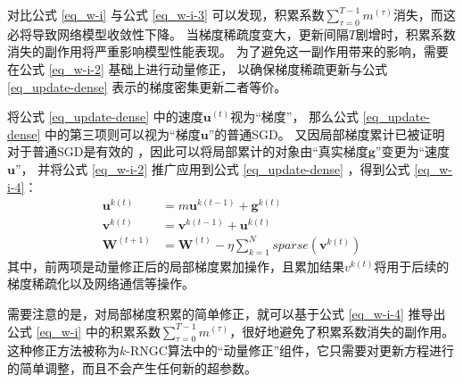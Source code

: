 \documentclass{xdupgthesis}
\begin{document}
对比公式 \eqref{eq_w-i} 与公式 \eqref{eq_w-i-3} 可以发现，积累系数$\sum_{\tau=0}^{T-1}m^{(\tau)}$消失，而这必将导致网络模型收敛性下降。
当梯度稀疏度变大，更新间隔$T$剧增时，积累系数消失的副作用将严重影响模型性能表现。
为了避免这一副作用带来的影响，需要在公式 \eqref{eq_w-i-2} 基础上进行动量修正，
以确保梯度稀疏更新与公式 \eqref{eq_update-dense} 表示的梯度密集更新二者等价。

将公式 \eqref{eq_update-dense} 中的速度$\mathbf{u}^{(t)}$视为“梯度”，
那么公式 \eqref{eq_update-dense} 中的第三项则可以视为“梯度$\mathbf{u}$”的普通SGD。
又因局部梯度累计已被证明对于普通SGD是有效的 \cite{lin2017deep}，因此可以将局部累计的对象由“真实梯度$\mathbf{g}$”变更为“速度$\mathbf{u}$”，
并将公式 \eqref{eq_w-i-2} 推广应用到公式 \eqref{eq_update-dense} ，得到公式 \eqref{eq_w-i-4}：
\begin{equation}
    \begin{aligned}
        \mathbf{u}^{k(t)} &= m\mathbf{u}^{k(t - 1)} + \mathbf{g}^{k(t)} \\
        \mathbf{v}^{k(t)} &= \mathbf{v}^{k(t - 1)} + \mathbf{u}^{k(t)} \\
        \mathbf{W}^{(t+1)} &= \mathbf{W}^{(t)} - \eta\sum_{k = 1}^{N} sparse\left( \mathbf{v}^{k(t)} \right)
    \end{aligned}
    \label{eq_w-i-4}
\end{equation}
其中，前两项是动量修正后的局部梯度累加操作，且累加结果$v^{k(t)}$将用于后续的梯度稀疏化以及网络通信等操作。

需要注意的是，对局部梯度积累的简单修正，就可以基于公式 \eqref{eq_w-i-4} 推导出公式 \eqref{eq_w-i} 中的积累系数$\sum_{\tau=0}^{T-1}m^{(\tau)}$，很好地避免了积累系数消失的副作用。
这种修正方法被称为$k$-RNGC算法中的“动量修正”组件，它只需要对更新方程进行的简单调整，而且不会产生任何新的超参数。
\end{document}
